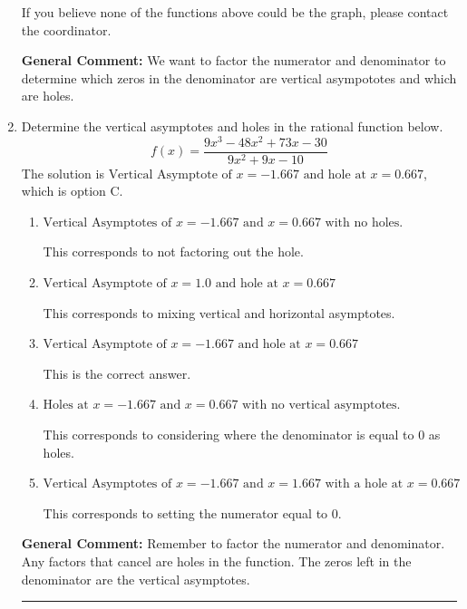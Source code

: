 \documentclass{extbook}[14pt]
\newcommand{\litem}[1]{\item #1

\rule{\textwidth}{0.4pt}}
\begin{document}
\begin{enumerate}
{\begin{enumerate}[label=\Alph*.]
If you believe none of the functions above could be the graph, please contact the coordinator.
\end{enumerate}

\textbf{General Comment:} We want to factor the numerator and denominator to determine which zeros in the denominator are vertical asympototes and which are holes.
}
\litem{
Determine the vertical asymptotes and holes in the rational function below.
\[ f(x) = \frac{9x^{3} -48 x^{2} +73 x -30}{9x^{2} +9 x -10} \]The solution is \( \text{Vertical Asymptote of } x = -1.667 \text{ and hole at } x = 0.667 \), which is option C.\begin{enumerate}[label=\Alph*.]
\item \( \text{Vertical Asymptotes of } x = -1.667 \text{ and } x = 0.667 \text{ with no holes.} \)

This corresponds to not factoring out the hole.
\item \( \text{Vertical Asymptote of } x = 1.0 \text{ and hole at } x = 0.667 \)

This corresponds to mixing vertical and horizontal asymptotes.
\item \( \text{Vertical Asymptote of } x = -1.667 \text{ and hole at } x = 0.667 \)

This is the correct answer.
\item \( \text{Holes at } x = -1.667 \text{ and } x = 0.667 \text{ with no vertical asymptotes.} \)

This corresponds to considering where the denominator is equal to 0 as holes.
\item \( \text{Vertical Asymptotes of } x = -1.667 \text{ and } x = 1.667 \text{ with a hole at } x = 0.667 \)

This corresponds to setting the numerator equal to 0.
\end{enumerate}

\textbf{General Comment:} Remember to factor the numerator and denominator. Any factors that cancel are holes in the function. The zeros left in the denominator are the vertical asymptotes.
}
\end{enumerate}
\end{document}
